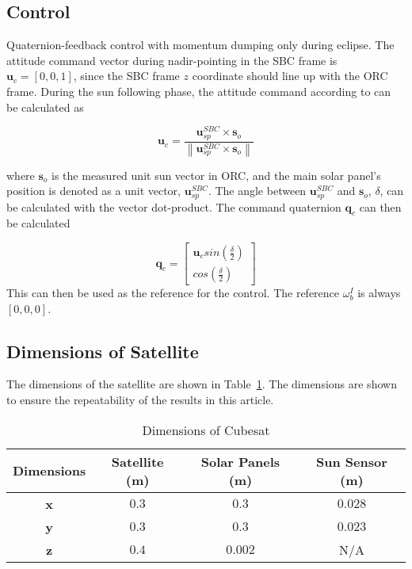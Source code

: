 \documentclass[letterpaper, 10 pt, conference]{ieeeconf}  %
\newcommand\norm[1]{\left\lVert#1\right\rVert}
\begin{document}
\subsection{Control}
Quaternion-feedback control with momentum dumping only during eclipse. The attitude command vector during nadir-pointing in the SBC frame is $\mathbf{u}_c = [0, 0, 1]$, since the SBC frame $z$ coordinate should line up with the ORC frame. During the sun following phase, the attitude command according to \textcite{chen2000ground} can be calculated as 

\begin{equation}
\mathbf{u}_c = \frac{\mathbf{u}_{sp}^{SBC} \times \mathbf{s}_o}{\norm{\mathbf{u}_{sp}^{SBC} \times \mathbf{s}_o}}
\end{equation}

where $\mathbf{s}_o$ is the measured unit sun vector in ORC, and the main solar panel's position is denoted as a unit vector, $\mathbf{u}_{sp}^{SBC}$. The angle between $\mathbf{u}_{sp}^{SBC}$ and $\mathbf{s}_o$, $\delta$, can be calculated with the vector dot-product. The command quaternion $\mathbf{q}_c$ can then be calculated

\begin{equation}
\mathbf{q}_c = \begin{bmatrix}
	\mathbf{u}_c sin(\frac{\delta}{2}) \\
	cos(\frac{\delta}{2})
\end{bmatrix}
\end{equation}
This can then be used as the reference for the control. The reference $\omega_b^I$ is always $[0, 0, 0]$.

\subsection{Dimensions of Satellite}
The dimensions of the satellite are shown in Table~\ref{Table:Dimensions}. The dimensions are shown to ensure the repeatability of the results in this article.

\begin{table}[!htb]
	\caption{\label{Table:Dimensions}Dimensions of Cubesat}
	\begin{tabular}{|c|c|c|c|}
		\hline
		\textbf{Dimensions} & \textbf{Satellite (m)} & \textbf{Solar Panels (m)} & \textbf{Sun Sensor (m)} \\ \hline
		\textbf{x}          & $0.3$                    & $0.3$                       & $0.028$                   \\ \hline
		\textbf{y}          & $0.3$                    & $0.3$                       & $0.023$                   \\ \hline
		\textbf{z}          & $0.4$                    & $0.002$                     & N/A                     \\ \hline
	\end{tabular}
\end{table}
\end{document}
